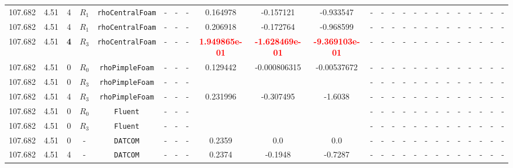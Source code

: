 \documentclass[12pt]{article}
\begin{document}
\begin{table}[H]
{\begin{tabular}{ccccc|ccc|ccc|ccc|ccc|ccccccc}
        \rowcolor{green!20}
        107.682 & 4.51 & {4} & $R_1$ & \texttt{rhoCentralFoam} & - & - & - & 0.164978 & -0.157121 & -0.933547 & - & - & - & - & - & - & - & - & - & - & - & - & - \\
        \rowcolor{green!30}
        107.682 & 4.51 & {4} & $R_1$ & \texttt{rhoCentralFoam} & - & - & - & 0.206918 & -0.172764 & -0.968599 & - & - & - & - & - & - & - & - & - & - & - & - & - \\
        \rowcolor{green!30}
        107.682 & 4.51 & \cellcolor{lime}\textbf{4} & \cellcolor{cyan}$R_3$ & \texttt{rhoCentralFoam} & - & - & - & \textcolor{red}{\textbf{1.949865e-01}} & \textcolor{red}{\textbf{-1.628469e-01}} & \textcolor{red}{\textbf{-9.369103e-01}} & - & - & - & - & - & - & - & - & - & - & - & - & - \\
        \rowcolor{blue!10}
        107.682 & 4.51 & 0 & $R_0$ & \texttt{rhoPimpleFoam} & - & - & - & 0.129442 & -0.000806315 & -0.00537672 & - & - & - & - & - & - & - & - & - & - & - & - & - \\ 
        \rowcolor{blue!40}
        107.682 & 4.51 & 0 & $R_3$ & \texttt{rhoPimpleFoam} & - & - & - &  & &  & - & - & - & - & - & - & - & - & - & - & - & - & - \\
        \rowcolor{blue!40}
        107.682 & 4.51 & 4 & $R_3$ & \texttt{rhoPimpleFoam} & - & - & - & 0.231996 & -0.307495 & -1.6038 & - & - & - & - & - & - & - & - & - & - & - & - & - \\
        \rowcolor{red!10}
        107.682 & 4.51 & 0 & $R_0$ & \texttt{Fluent} & - & - & - &  &  &  & - & - & - & - & - & - & - & - & - & - & - & - & - \\ 
        \rowcolor{red!40}
        107.682 & 4.51 & 0 & $R_3$ & \texttt{Fluent} & - & - & - &  &  &  & - & - & - & - & - & - & - & - & - & - & - & - & - \\ 
        \rowcolor{gray!10}
        107.682 & 4.51 & 0 & - & \texttt{DATCOM} & - & - & - & 0.2359 & 0.0 & 0.0 & - & - & - & - & - & - & - & - & - & - & - & - & - \\ 
        \rowcolor{gray!10}
        107.682 & 4.51 & 4 & - & \texttt{DATCOM} & - & - & - & 0.2374 & -0.1948 & -0.7287  & - & - & - & - & - & - & - & - & - & - & - & - & - \\ 
        \hline 
        \hline 
    \end{tabular}}
\end{table}
\end{document}
